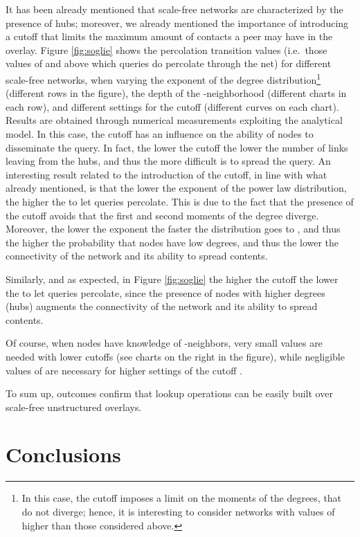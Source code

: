 \documentclass{sig-alternate}
\begin{document}
It has been already mentioned that scale-free networks are characterized by the presence of hubs; moreover, we already mentioned the importance of introducing a cutoff that limits the maximum amount of contacts a peer may have in the overlay. Figure \ref{fig:soglie} shows the percolation transition values (i.e.~those values of  and  above which queries do percolate through the net) for different scale-free networks, when varying the exponent  of the degree distribution\footnote{In this case, the cutoff imposes a limit on the moments of the degrees, that do not diverge; hence, it is interesting to consider networks with values of  higher than those considered above.} (different rows in the figure), the depth  of the -neighborhood (different charts in each row), and different settings for the cutoff  (different curves on each chart).
Results are obtained through numerical measurements exploiting the analytical model. 
In this case, the cutoff has an influence on the ability of nodes to disseminate the query. In fact, the lower the cutoff the lower the number of links leaving from the hubs, and thus the more difficult is to spread the query. 
An interesting result related to the introduction of the cutoff, in line with what already mentioned, is that the lower the exponent  of the power law distribution, the higher the  to let queries percolate. 
This is due to the fact that the presence of the cutoff avoids that the first and second moments of the degree diverge. Moreover, the lower the exponent  the faster the distribution goes to , and thus the higher the probability that nodes have low degrees, and thus the lower the connectivity of the network and its ability to spread contents.

Similarly, and as expected, in Figure \ref{fig:soglie} the higher the cutoff the lower the  to let queries percolate, since the presence of nodes with higher degrees (hubs) augments the connectivity of the network and its ability to spread contents.

Of course, when nodes have knowledge of -neighbors, very small  values are needed with lower cutoffs (see charts on the right in the figure), while negligible values of  are necessary for higher settings of the cutoff .

To sum up, outcomes confirm that lookup operations can be easily built over scale-free unstructured overlays.



\section{Conclusions}\label{sec:conc}
\end{document}
